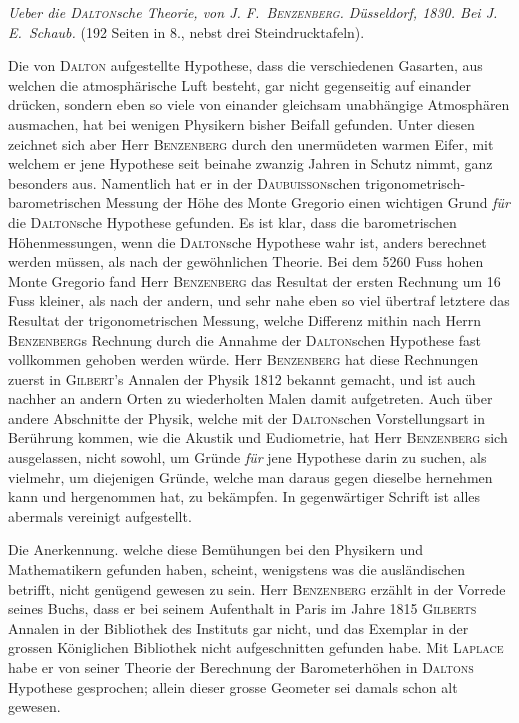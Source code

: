 \textit{Ueber die \textup{\textsc{Dalton}}sche Theorie, von \textup{J. F.\ \textsc{Benzenberg}.} Düsseldorf, \textup{1830.} Bei J. E.\ Schaub.} (192 Seiten in 8., nebst drei Steindrucktafeln).

Die von \textsc{Dalton} aufgestellte Hypothese, dass die verschiedenen Gasarten, aus welchen die atmosphärische Luft besteht, gar nicht gegenseitig auf einander drücken, sondern eben so viele von einander gleichsam unabhängige Atmosphären ausmachen, hat bei wenigen Physikern bisher Beifall gefunden. Unter diesen zeichnet sich aber Herr \textsc{Benzenberg} durch den unermüdeten warmen Eifer, mit welchem er jene Hypothese seit beinahe zwanzig Jahren in Schutz nimmt, ganz besonders aus. Namentlich hat er in der \textsc{Daubuisson}schen trigonometrisch-barometrischen Messung der Höhe des Monte Gregorio einen wichtigen Grund \textit{für} die \textsc{Dalton}sche Hypothese gefunden. Es ist klar, dass die barometrischen Höhenmessungen, wenn die \textsc{Dalton}sche Hypothese wahr ist, anders berechnet werden müssen, als nach der gewöhnlichen Theorie. Bei dem 5260 Fuss hohen Monte Gregorio fand Herr \textsc{Benzenberg} das Resultat der ersten Rechnung um 16 Fuss kleiner, als nach der andern, und sehr nahe eben so viel übertraf letztere das Resultat der trigonometrischen Messung, welche Differenz mithin nach Herrn \textsc{Benzenberg}s Rechnung durch die Annahme der \textsc{Dalton}schen Hypothese fast vollkommen gehoben werden würde. Herr \textsc{Benzenberg} hat diese Rechnungen zuerst in \textsc{Gilbert}'s Annalen der Physik 1812 bekannt gemacht, und ist auch nachher
an andern Orten zu wiederholten Malen damit aufgetreten. Auch über andere Abschnitte der Physik, welche mit der \textsc{Dalton}schen Vorstellungsart in Berührung kommen, wie die Akustik und Eudiometrie, hat Herr \textsc{Benzenberg} sich ausgelassen, nicht sowohl, um Gründe \textit{für} jene Hypothese darin zu suchen, als vielmehr, um diejenigen Gründe, welche man daraus gegen dieselbe hernehmen kann und hergenommen hat, zu bekämpfen. In gegenwärtiger Schrift ist alles abermals vereinigt aufgestellt.

Die Anerkennung. welche diese Bemühungen bei den Physikern und Mathematikern gefunden haben, scheint, wenigstens was die ausländischen betrifft, nicht genügend gewesen zu sein. Herr \textsc{Benzenberg} erzählt in der Vorrede seines Buchs, dass er bei seinem Aufenthalt in Paris im Jahre 1815 \textsc{Gilberts} Annalen in der Bibliothek des Instituts gar nicht, und das Exemplar in der grossen Königlichen Bibliothek nicht aufgeschnitten gefunden habe. Mit \textsc{Laplace} habe er von seiner Theorie der Berechnung der Barometerhöhen in \textsc{Daltons} Hypothese gesprochen; allein dieser grosse Geometer sei damals schon alt gewesen.

